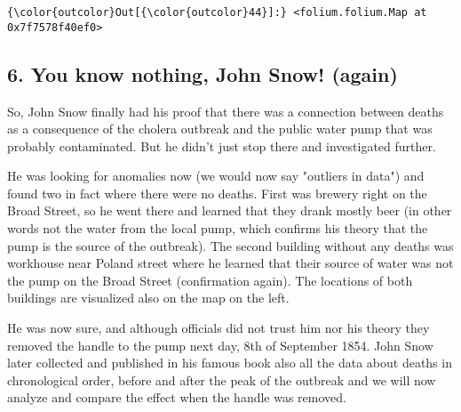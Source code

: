 \documentclass[11pt]{article}
\begin{document}
\begin{Verbatim}[commandchars=\\\{\}]
{\color{outcolor}Out[{\color{outcolor}44}]:} <folium.folium.Map at 0x7f7578f40ef0>
\end{Verbatim}
            
    \subsection{6. You know nothing, John Snow!
(again)}\label{you-know-nothing-john-snow-again}

So, John Snow finally had his proof that there was a connection between
deaths as a consequence of the cholera outbreak and the public water
pump that was probably contaminated. But he didn't just stop there and
investigated further.

He was looking for anomalies now (we would now say "outliers in data")
and found two in fact where there were no deaths. First was brewery
right on the Broad Street, so he went there and learned that they drank
mostly beer (in other words not the water from the local pump, which
confirms his theory that the pump is the source of the outbreak). The
second building without any deaths was workhouse near Poland street
where he learned that their source of water was not the pump on the
Broad Street (confirmation again). The locations of both buildings are
visualized also on the map on the left.

He was now sure, and although officials did not trust him nor his theory
they removed the handle to the pump next day, 8th of September 1854.
John Snow later collected and published in his famous book also all the
data about deaths in chronological order, before and after the peak of
the outbreak and we will now analyze and compare the effect when the
handle was removed.
\end{document}
